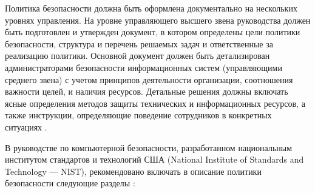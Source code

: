 Политика безопасности должна быть оформлена документально на нескольких уровнях управления. На уровне управляющего
высшего звена руководства должен быть подготовлен и утвержден документ, в котором определены цели политики
безопасности, структура и перечень решаемых задач и ответственные за реализацию политики. Основной документ
должен быть детализирован администраторами безопасности информационных систем (управляющими среднего звена)
с учетом принципов деятельности организации, соотношения важности целей, и наличия ресурсов. Детальные решения
должны включать ясные определения методов защиты технических и информационных ресурсов, а также инструкции,
определяющие поведение сотрудников в конкретных ситуациях \autocite{shveikin}.

В руководстве по компьютерной безопасности, разработанном национальным институтом стандартов и технологий
США (National Institute of Standards and Technology — NIST), рекомендовано включать в описание
политики безопасности следующие разделы  \autocite{nurzhanov}:
